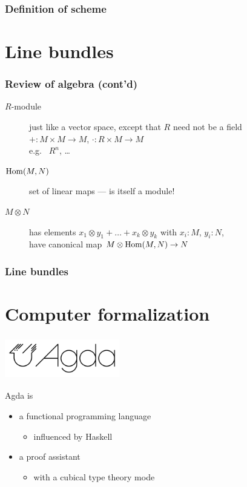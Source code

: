 \documentclass[aspectratio=1610]{beamer}
\begin{document}
\begin{frame}
  \frametitle{Definition of scheme}
\end{frame}

\section{Line bundles}

\begin{frame}
  \frametitle{Review of algebra (cont'd)}

  \begin{description}
    \item[$R$-module]
      just like a vector space, except that $R$ need not be a field\\
      ${+} : M \times M \to M$, ${\cdot} : R \times M \to M$\\
      {
      e.g.\ %
      $R^n$,
      \dots}
      \pause%
    \bigskip
    \item[$\mathrm{Hom}(M, N)$]
      set of linear maps
      --- is itself a module!
      \pause%
    \bigskip
    \item[$M \otimes N$]
      has elements $x_1 \otimes y_1 + \dots + x_k \otimes y_k$ with $x_i : M$, $y_i : N$,\\
      have canonical map $M \otimes \mathrm{Hom}(M, N) \to N$
  \end{description}
\end{frame}

\begin{frame}
  \frametitle{Line bundles}
\end{frame}

\section{Computer formalization}

\begin{frame}
  \frametitle{\includegraphics[width=5cm]{./images/agda-logo.png}}

  Agda is
  \begin{itemize}
    \item
      a functional programming language
      \begin{itemize}
        \item
          influenced by Haskell
      \end{itemize}
    \item
      a proof assistant
      \begin{itemize}
        \item
          with a \alert{cubical type theory} mode
      \end{itemize}
  \end{itemize}
\end{frame}
\end{document}
